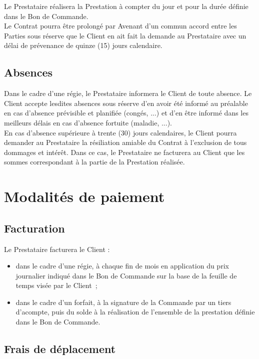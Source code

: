 \documentclass[9pt,french]{base}
\begin{document}
\begin{multicols*}{3}
Le Prestataire réalisera la Prestation à compter du jour et pour la durée définie dans le Bon de Commande. \\
Le Contrat pourra être prolongé par Avenant d’un commun accord entre les Parties sous réserve que le Client en ait fait la demande au Prestataire avec un délai de prévenance de quinze (15) jours calendaire.

\subsection{Absences}

Dans le cadre d’une régie, le Prestataire informera le Client de toute absence.
Le Client accepte lesdites absences sous réserve d’en avoir été informé au préalable en cas d’absence prévisible et planifiée (congés, ...) et d’en être informé dans les meilleurs délais en cas d’absence fortuite (maladie, ...). \\
En cas d’absence supérieure à trente (30) jours calendaires, le Client pourra demander au Prestataire la résiliation amiable du Contrat à l’exclusion de tous dommages et intérêt. Dans ce cas, le Prestataire ne facturera au Client que les sommes correspondant à la partie de la Prestation réalisée.

\section{Modalités de paiement}

\subsection{Facturation}

Le Prestataire facturera le Client :
\begin{itemize}
  \item dans le cadre d’une régie, à chaque fin de mois en application du prix journalier indiqué dans le Bon de Commande sur la base de la feuille de temps visée par le Client~;
  \item dans le cadre d’un forfait, à la signature de la Commande par un tiers d’acompte, puis du solde à la réalisation de l’ensemble de la prestation définie dans le Bon de Commande.
\end{itemize}

\subsection{Frais de déplacement}


\end{multicols*}
\end{document}

